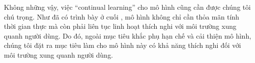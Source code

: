 	Không những vậy, việc ``continual learning'' cho mô hình cũng cần được chúng tôi chú trọng. Như đã có trình bày ở cuối , mô hình không chỉ cần thỏa mãn tính thời gian thực mà còn phải liên tục linh hoạt thích nghi với môi trường xung quanh người dùng. Do đó, ngoài mục tiêu khắc phụ hạn chế và cải thiện mô hình, chúng tôi đặt ra mục tiêu làm cho mô hình này có khả năng thích nghi đối với môi trường xung quanh người dùng.